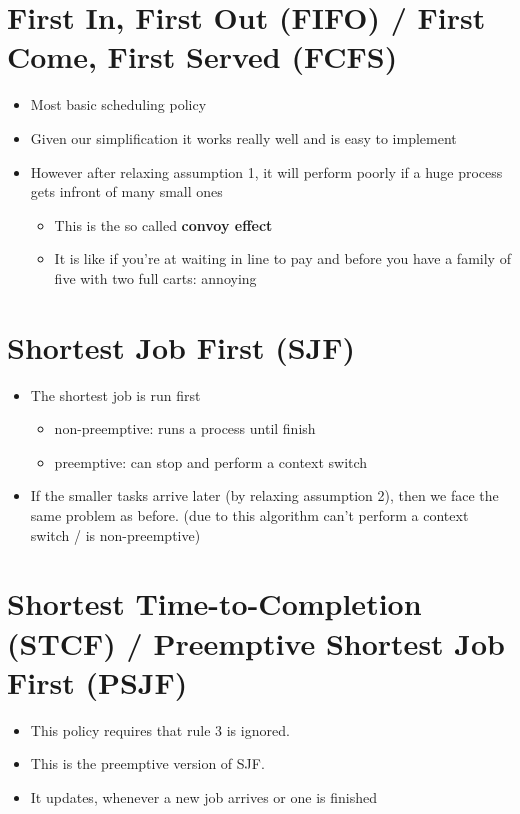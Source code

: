 \documentclass[11pt]{report}
\begin{document}
\section{First In, First Out (FIFO) / First Come, First Served (FCFS)}
\label{sec:org930f0a2}
\begin{itemize}
\item Most basic scheduling policy
\item Given our simplification it works really well and is easy to implement
\item However after relaxing assumption 1, it will perform poorly if a huge process gets infront of many small ones
\begin{itemize}
\item This is the so called \textbf{convoy effect}
\item It is like if you're at waiting in line to pay and before you have a family of five with two full carts: annoying
\end{itemize}
\end{itemize}
\section{Shortest Job First (SJF)}
\label{sec:org1f10514}
\begin{itemize}
\item The shortest job is run first
\begin{itemize}
\item non-preemptive: runs a process until finish
\item preemptive: can stop and perform a context switch
\end{itemize}
\item If the smaller tasks arrive later (by relaxing assumption 2), then we face the same problem as before. (due to this algorithm can't perform a context switch / is non-preemptive)
\end{itemize}
\section{Shortest Time-to-Completion (STCF) / Preemptive Shortest Job First (PSJF)}
\label{sec:orgb6c2621}
\begin{itemize}
\item This policy requires that rule 3 is ignored.
\item This is the preemptive version of SJF.
\item It updates, whenever a new job arrives or one is finished
\end{itemize}
\end{document}
